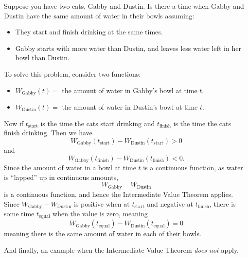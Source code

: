 \documentclass{ximera}
\begin{document}
\begin{example}
Suppose you have two cats, Gabby and Dustin. Is there a time when Gabby
and Dustin have the same amount of water in their bowls assuming:
  \begin{itemize}
  \item They start and finish drinking at the same times.
  \item Gabby starts with more water than Dustin, and leaves less water
    left in her bowl than Dustin.
  \end{itemize}

\begin{explanation} 
  To solve this problem, consider two functions:
  \begin{itemize}
    \item $W_{\mathrm{Gabby}}(t) =$ the amount of water in Gabby's bowl at time $t$.
    \item $W_{\mathrm{Dustin}}(t) =$ the amount of water in Dustin's bowl at time $t$.
  \end{itemize}
  Now if $t_\mathrm{start}$ is the time the cats start drinking and
  $t_\mathrm{finish}$ is the time the cats finish drinking. Then we have
  \[
  W_\mathrm{Gabby}(t_\mathrm{start})-W_{\mathrm{Dustin}}(t_\mathrm{start}) > 0%
  \]
  and
  \[
  W_\mathrm{Gabby}(t_\mathrm{finish})-W_{\mathrm{Dustin}}(t_\mathrm{finish}) < 0.
  \]
  Since the amount of water in a bowl at time $t$ is a continuous
  function, as water is ``lapped'' up in continuous amounts,
  \[
  W_\mathrm{Gabby}-W_{\mathrm{Dustin}}
  \]
  is a continuous function, and hence the Intermediate Value Theorem
  applies. Since $W_\mathrm{Gabby}-W_{\mathrm{Dustin}}$ is positive when
  at $t_\mathrm{start}$ and negative at $t_\mathrm{finish}$, there is
  some time $t_\mathrm{equal}$ when the value is zero, meaning
  \[
  W_\mathrm{Gabby}(t_\mathrm{equal})-  W_{\mathrm{Dustin}}(t_\mathrm{equal}) =0
  \]
  meaning there is the same amount of water in each of their bowls.
\end{explanation}
\end{example}


And finally, an example when the Intermediate Value Theorem
\textit{does not} apply.
\end{document}
